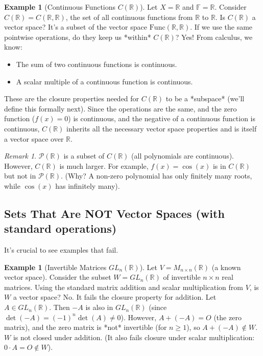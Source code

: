 \documentclass[11pt]{article}
\theoremstyle{definition}
\newtheorem{example}[theorem]{Example}
\theoremstyle{remark}
\newtheorem{remark}[theorem]{Remark}
\newcommand{\R}{\mathbb{R}}
\newcommand{\F}{\mathbb{F}} %
\newcommand{\Mat}[3]{M_{#1 \times #2}(#3)}
\newcommand{\Poly}[1]{\mathcal{P}(#1)}
\newcommand{\Func}[2]{\mathrm{Func}(#1, #2)}
\newcommand{\ContFunc}[2]{C(#1, #2)} %
\begin{document}
\begin{example}[Continuous Functions $C(\R)$]
Let $X=\R$ and $\F=\R$. Consider $C(\R) = \ContFunc{\R}{\R}$, the set of all continuous functions from $\R$ to $\R$.
Is $C(\R)$ a vector space? It's a subset of the vector space $\Func{\R}{\R}$. If we use the same pointwise operations, do they keep us *within* $C(\R)$?
Yes! From calculus, we know:
\begin{itemize}
    \item The sum of two continuous functions is continuous.
    \item A scalar multiple of a continuous function is continuous.
\end{itemize}
These are the closure properties needed for $C(\R)$ to be a *subspace* (we'll define this formally next). Since the operations are the same, and the zero function ($f(x)=0$) is continuous, and the negative of a continuous function is continuous, $C(\R)$ inherits all the necessary vector space properties and is itself a vector space over $\R$.
\end{example}

\begin{remark}
$\Poly{\R}$ is a subset of $C(\R)$ (all polynomials are continuous). However, $C(\R)$ is much larger. For example, $f(x) = \cos(x)$ is in $C(\R)$ but not in $\Poly{\R}$. (Why? A non-zero polynomial has only finitely many roots, while $\cos(x)$ has infinitely many).
\end{remark}

\subsection{Sets That Are NOT Vector Spaces (with standard operations)}

It's crucial to see examples that fail.
\begin{example}[Invertible Matrices $GL_n(\R)$]
Let $V = \Mat{n}{n}{\R}$ (a known vector space). Consider the subset $W = GL_n(\R)$ of invertible $n \times n$ real matrices. Using the standard matrix addition and scalar multiplication from $V$, is $W$ a vector space?
No. It fails the closure property for addition. Let $A \in GL_n(\R)$. Then $-A$ is also in $GL_n(\R)$ (since $\det(-A) = (-1)^n \det(A) \neq 0$). However, $A + (-A) = O$ (the zero matrix), and the zero matrix is *not* invertible (for $n \ge 1$), so $A+(-A) \notin W$. $W$ is not closed under addition.
(It also fails closure under scalar multiplication: $0 \cdot A = O \notin W$).
\end{example}
\end{document}
